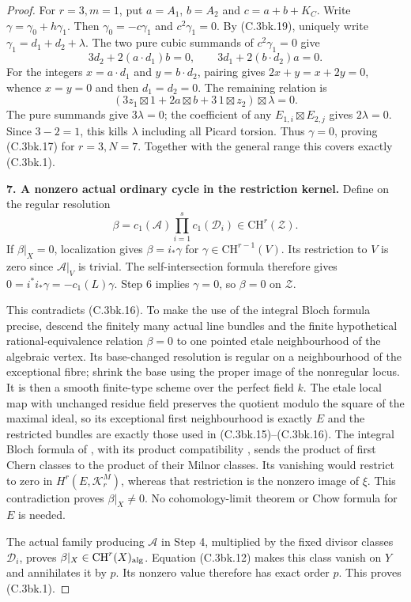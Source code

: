 \begin{proof}
For $r=3,m=1$, put $a=A_1$, $b=A_2$ and $c=a+b+K_C$.
Write $\gamma=\gamma_0+h\gamma_1$. Then
$\gamma_0=-c\gamma_1$ and $c^2\gamma_1=0$.
By (C.3bk.19), uniquely write
$\gamma_1=d_1+d_2+\lambda$.
The two pure cubic summands of $c^2\gamma_1=0$ give
\[
 3d_2+2(a\cdot d_1)b=0,\qquad
 3d_1+2(b\cdot d_2)a=0.
 \tag{C.3bk.21}
\]
For the integers $x=a\cdot d_1$ and $y=b\cdot d_2$, pairing gives
$2x+y=x+2y=0$, whence $x=y=0$ and then $d_1=d_2=0$.
The remaining relation is
\[
 (3z_1\boxtimes1+2a\boxtimes b+3\,1\boxtimes z_2)
                         \boxtimes\lambda=0.
\]
The pure summands give $3\lambda=0$; the coefficient of any
$E_{1,i}\boxtimes E_{2,j}$ gives $2\lambda=0$.
Since $3-2=1$, this kills $\lambda$ including all Picard torsion.
Thus $\gamma=0$, proving (C.3bk.17) for $r=3,N=7$.
Together with the general range this covers exactly (C.3bk.1).

\textbf{7. A nonzero actual ordinary cycle in the restriction kernel.}
Define on the regular resolution
\[
 \beta=c_1(\mathcal A)\prod_{i=1}^s c_1(\mathcal D_i)
                  \in\mathrm{CH}^r(\mathcal Z).
 \tag{C.3bk.22}
\]
If $\beta|_X=0$, localization gives
$\beta=i_*\gamma$ for $\gamma\in\mathrm{CH}^{r-1}(V)$.
Its restriction to $V$ is zero since $\mathcal A|_V$ is trivial.
The self-intersection formula therefore gives
$0=i^*i_*\gamma=-c_1(L)\gamma$.
Step 6 implies $\gamma=0$, so $\beta=0$ on $\mathcal Z$.

This contradicts (C.3bk.16). To make the use of the integral
Bloch formula precise, descend the finitely many actual line bundles
and the finite hypothetical rational-equivalence relation $\beta=0$
to one pointed etale neighbourhood of the algebraic vertex.
Its base-changed resolution is regular on a neighbourhood of the
exceptional fibre; shrink the base using the proper image of the
nonregular locus. It is then a smooth finite-type scheme over the
perfect field $k$. The etale local map with unchanged residue field
preserves the quotient modulo the square of the maximal ideal, so
its exceptional first neighbourhood is exactly $E$ and the restricted
bundles are exactly those used in (C.3bk.15)--(C.3bk.16).
The integral Bloch formula of
\citet[Theorems 7.1 and 7.5]{cyKerz2009Milnor}, with its product
compatibility \citep[Section 3, pp.~557--558, diagram (22)]{cyBraunling2013},
sends the product of first Chern classes to the product of their
Milnor classes. Its vanishing would restrict to zero in
$H^r(E,\mathcal K_r^M)$, whereas that restriction is the nonzero
image of $\xi$. This contradiction proves $\beta|_X\ne0$.
No cohomology-limit theorem or Chow formula for $E$ is needed.

The actual family producing $\mathcal A$ in Step 4, multiplied by
the fixed divisor classes $\mathcal D_i$, proves
$\beta|_X\in\mathrm{CH}^r(X)_{\rm alg}$.
Equation (C.3bk.12) makes this class vanish on $Y$ and annihilates
it by $p$. Its nonzero value therefore has exact order $p$.
This proves (C.3bk.1).
\end{proof}

